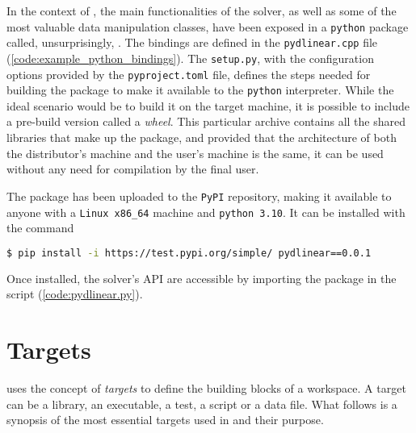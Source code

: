 In the context of \dlinear, the main functionalities of the solver, as well as some of the most valuable data manipulation classes, have been exposed in a \texttt{python} package called, unsurprisingly, \pydlinear.
The bindings are defined in the \texttt{pydlinear.cpp} file (\autoref{code:example_python_bindings}).
The \texttt{setup.py}, with the configuration options provided by the \texttt{pyproject.toml} file, defines the steps needed for building the package to make it available to the \texttt{python} interpreter.
While the ideal scenario would be to build it on the target machine, it is possible to include a pre-build version called a \textit{wheel}.
This particular archive contains all the shared libraries that make up the package, and provided that the architecture of both the distributor's machine and the user's machine is the same, it can be used without any need for compilation by the final user.



The package has been uploaded to the \texttt{PyPI} repository, making it available to anyone with a \texttt{Linux x86\_64} machine and \texttt{python 3.10}.
It can be installed with the command

\begin{lstlisting}[language=bash,frame=single,showstringspaces=false]
$ pip install -i https://test.pypi.org/simple/ pydlinear==0.0.1
\end{lstlisting}
Once installed, the solver's API are accessible by importing the \pydlinear package in the script (\autoref{code:pydlinear.py}).



\section{Targets}

\bazel uses the concept of \textit{targets} to define the building blocks of a workspace.
A target can be a library, an executable, a test, a script or a data file.
What follows is a synopsis of the most essential targets used in \dlinear and their purpose.

